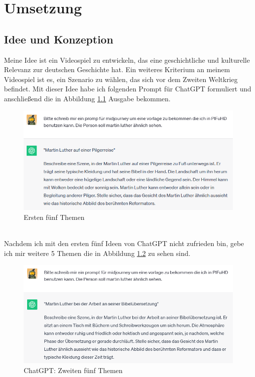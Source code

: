 \chapter{Umsetzung}
\section {Idee und Konzeption}
Meine Idee ist ein Videospiel zu entwickeln, das eine geschichtliche und kulturelle Relevanz zur deutschen Geschichte hat. Ein weiteres Kriterium an meinem Videospiel ist es, ein Szenario zu wählen, das sich vor dem Zweiten Weltkrieg befindet. Mit dieser Idee habe ich folgenden Prompt für ChatGPT formuliert und anschließend die in Abbildung \ref{ersten-5-themen} Ausgabe bekommen.
\begin{figure}[h]
   		 \centering
\includegraphics[width=14cm]{BilderFuerBA/01.png}
   		 \caption{Ersten fünf Themen}
   		 \label{ersten-5-themen}
\end{figure}
\\
Nachdem ich mit den ersten fünf Ideen von ChatGPT nicht zufrieden bin, gebe ich mir weitere 5 Themen die in Abbildung \ref{zweiten-5-themen} zu sehen sind.
\begin{figure}[h]
   		 \centering
\includegraphics[width=14cm]{BilderFuerBA/02.png}
   		 \caption{ChatGPT: Zweiten fünf Themen}
   		 \label{zweiten-5-themen}
\end{figure}
